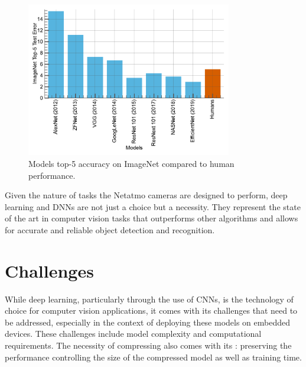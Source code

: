 \begin{figure}[htbp]
      \centering
      \includegraphics[width=0.8\textwidth]{chapter_intro/assets/models_vs_human.pdf}
      \caption{Models top-5 accuracy on ImageNet \cite{deng2009imagenet} compared
            to human performance.}
      \label{fig:intro:models_vs_humans}
\end{figure}

Given the nature of tasks the Netatmo cameras are designed to perform, deep
learning and \aclp{DNN} are not just a choice but a necessity. They represent
the state of the art in computer vision tasks that outperforms other algorithms
and allows for accurate and reliable object detection and recognition.\\

\section{Challenges}

While deep learning, particularly through the use of \acp{CNN}, is the
technology of choice for computer vision applications, it comes with its
\DIFdelbegin {}\DIFdelend challenges that need to be addressed, especially in the context of deploying
these \DIFaddbegin {}\DIFaddend models on embedded devices. These challenges include model
complexity and computational requirements. The necessity of compressing \DIFdelbegin {}\DIFdelend \DIFaddbegin {}\DIFaddend also comes with its \DIFdelbegin {}\DIFdelend \DIFaddbegin {}\DIFaddend : preserving the performance \DIFdelbegin \DIFdel{,  }\DIFdelend \DIFaddbegin {}\DIFaddend controlling the size of the compressed
model as well as \DIFdelbegin {}\DIFdelend training time.\\


